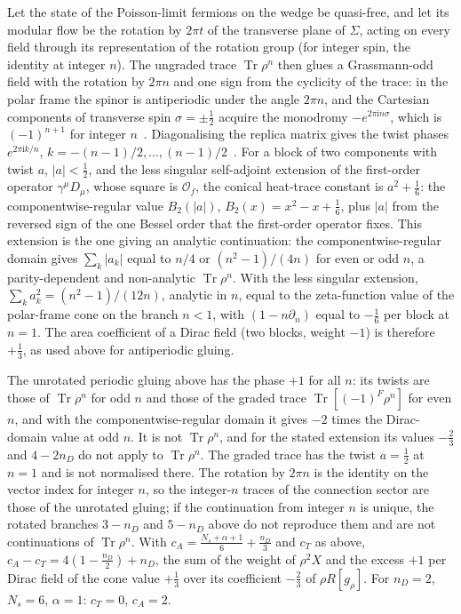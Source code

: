 Let the state of the Poisson-limit fermions on the wedge be quasi-free, and let its modular flow be the rotation by \(2\pi t\) of the transverse plane of \(\Sigma\), acting on every field through its representation of the rotation group (for integer spin, the identity at integer \(n\)). The ungraded trace \(\operatorname{Tr}\rho^n\) then glues a Grassmann-odd field with the rotation by \(2\pi n\) and one sign from the cyclicity of the trace: in the polar frame the spinor is antiperiodic under the angle \(2\pi n\), and the Cartesian components of transverse spin \(\sigma=\pm\tfrac12\) acquire the monodromy \(-e^{2\pi\mathrm in\sigma}\), which is \((-1)^{n+1}\) for integer \(n\)~\cite{CasiniHuerta2009,FursaevMiele1997}. Diagonalising the replica matrix gives the twist phases \(e^{2\pi\mathrm ik/n}\), \(k=-(n-1)/2,\dots,(n-1)/2\)~\cite{CasiniHuerta2009}. For a block of two components with twist \(a\), \(|a|<\tfrac12\), and the less singular self-adjoint extension of the first-order operator \(\gamma^\mu D_\mu\), whose square is \(\mathcal O_f\), the conical heat-trace constant is \(a^2+\tfrac16\): the componentwise-regular value \(B_2(|a|)\), \(B_2(x)=x^2-x+\tfrac16\), plus \(|a|\) from the reversed sign of the one Bessel order that the first-order operator fixes. This extension is the one giving an analytic continuation: the componentwise-regular domain gives \(\sum_k|a_k|\) equal to \(n/4\) or \((n^2-1)/(4n)\) for even or odd \(n\), a parity-dependent and non-analytic \(\operatorname{Tr}\rho^n\). With the less singular extension, \(\sum_ka_k^2=(n^2-1)/(12n)\), analytic in \(n\), equal to the zeta-function value of the polar-frame cone on the branch \(n<1\), with \((1-n\partial_n)\) equal to \(-\tfrac16\) per block at \(n=1\). The area coefficient of a Dirac field (two blocks, weight \(-1\)) is therefore \(+\tfrac13\), as used above for antiperiodic gluing.



The unrotated periodic gluing above has the phase \(+1\) for all \(n\): its twists are those of \(\operatorname{Tr}\rho^n\) for odd \(n\) and those of the graded trace \(\operatorname{Tr}[(-1)^F\rho^n]\) for even \(n\), and with the componentwise-regular domain it gives \(-2\) times the Dirac-domain value at odd \(n\). It is not \(\operatorname{Tr}\rho^n\), and for the stated extension its values \(-\tfrac23\) and \(4-2n_D\) do not apply to \(\operatorname{Tr}\rho^n\). The graded trace has the twist \(a=\tfrac12\) at \(n=1\) and is not normalised there. The rotation by \(2\pi n\) is the identity on the vector index for integer \(n\), so the integer-\(n\) traces of the connection sector are those of the unrotated gluing; if the continuation from integer \(n\) is unique, the rotated branches \(3-n_D\) and \(5-n_D\) above do not reproduce them and are not continuations of \(\operatorname{Tr}\rho^n\). With \(c_A=\tfrac{N_s+\alpha+1}6+\tfrac{n_D}3\) and \(c_T\) as above, \(c_A-c_T=4(1-\tfrac{n_D}2)+n_D\), the sum of the weight of \(\rho^2X\) and the excess \(+1\) per Dirac field of the cone value \(+\tfrac13\) over its coefficient \(-\tfrac23\) of \(\rho R[g_\rho]\). For \(n_D=2\), \(N_s=6\), \(\alpha=1\): \(c_T=0\), \(c_A=2\).



